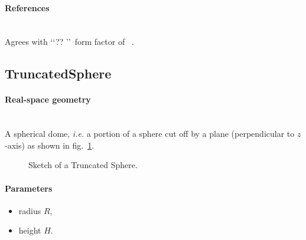 \paragraph{References}\strut\\
Agrees with \lq\lq ?? \rq\rq\ form factor of \IsGISAXS~\cite{Laz02}.


\newpage
\subsection{TruncatedSphere}
  
\paragraph{Real-space geometry}\strut\\
A spherical dome, \textit{i.e.} a portion of a sphere cut off by a plane (perpendicular
to $z$-axis) as shown in fig.~\ref{fig:sphere}.

\begin{figure}[ht]
\hfill
{}
\hfill
{}
\hfill
\caption{Sketch of a Truncated Sphere.}
\label{fig:sphere}
\end{figure}
\FloatBarrier

\paragraph{Parameters}
\begin{itemize}
\item radius $R$,
\item height $H$.
\end{itemize}

